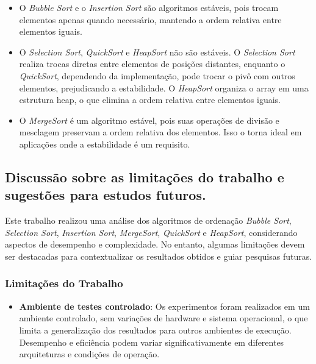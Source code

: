 \documentclass[a4paper,12pt]{article}
\begin{document}
\begin{itemize}
    \item O \textit{Bubble Sort} e o \textit{Insertion Sort} são algoritmos estáveis, pois trocam elementos apenas quando necessário, mantendo a ordem relativa entre elementos iguais.
    \item O \textit{Selection Sort}, \textit{QuickSort} e \textit{HeapSort} não são estáveis. O \textit{Selection Sort} realiza trocas diretas entre elementos de posições distantes, enquanto o \textit{QuickSort}, dependendo da implementação, pode trocar o pivô com outros elementos, prejudicando a estabilidade. O \textit{HeapSort} organiza o array em uma estrutura heap, o que elimina a ordem relativa entre elementos iguais.
    \item O \textit{MergeSort} é um algoritmo estável, pois suas operações de divisão e mesclagem preservam a ordem relativa dos elementos. Isso o torna ideal em aplicações onde a estabilidade é um requisito.
\end{itemize}

\subsection{Discussão sobre as limitações do trabalho e sugestões para estudos futuros.}

Este trabalho realizou uma análise dos algoritmos de ordenação \textit{Bubble Sort}, \textit{Selection Sort}, \textit{Insertion Sort}, \textit{MergeSort}, \textit{QuickSort} e \textit{HeapSort}, considerando aspectos de desempenho e complexidade. No entanto, algumas limitações devem ser destacadas para contextualizar os resultados obtidos e guiar pesquisas futuras.

\subsubsection{Limitações do Trabalho}
\begin{itemize}
    
    \item \textbf{Ambiente de testes controlado}: Os experimentos foram realizados em um ambiente controlado, sem variações de hardware e sistema operacional, o que limita a generalização dos resultados para outros ambientes de execução. Desempenho e eficiência podem variar significativamente em diferentes arquiteturas e condições de operação.


\end{itemize}
\end{document}
